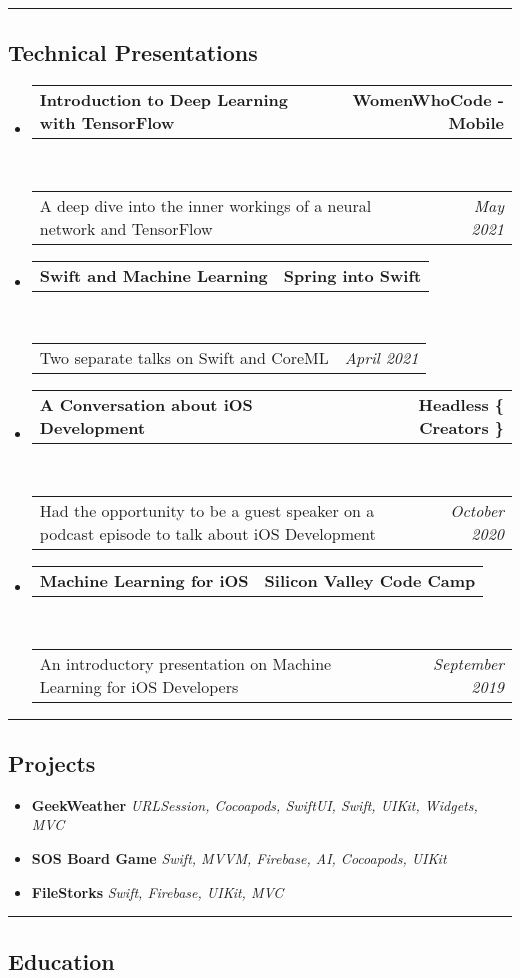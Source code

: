 \documentclass[9pt,letterpaper]{article}
\makeatletter
\newcommand{\headerrow}[2]
{\begin{tabular*}{\linewidth}{l@{\extracolsep{\fill}}r}
	#1 &
	#2 \\
\end{tabular*}}
\makeatother
\begin{document}
\hrule
\vspace{-0.4em}
\subsection*{Technical Presentations}

\begin{itemize}
	\parskip=0.1em
	\item
	\headerrow
		{\textbf{Introduction to Deep Learning with TensorFlow}}
		{\textbf{WomenWhoCode - Mobile}}
	\\
	\headerrow
		{A deep dive into the inner workings of a neural network and TensorFlow}
		{\emph{May 2021}}
	\item
	\headerrow
		{\textbf{Swift and Machine Learning}}
		{\textbf{Spring into Swift}}
	\\
	\headerrow
		{Two separate talks on Swift and CoreML}
		{\emph{April 2021}}
	\item
	\headerrow
		{\textbf{A Conversation about iOS Development}}
		{\textbf{Headless \{ Creators \}}}
	\\
	\headerrow
		{Had the opportunity to be a guest speaker on a podcast episode to talk about iOS Development}
		{\emph{October 2020}}
	\item
	\headerrow
		{\textbf{Machine Learning for iOS}}
		{\textbf{Silicon Valley Code Camp}}
	\\
	\headerrow
		{An introductory presentation on Machine Learning for iOS Developers}
		{\emph{September 2019}}
\end{itemize}

\hrule
\vspace{-0.4em}
\subsection*{Projects}

\begin{itemize}
	\parskip=0.1em
	\item {\textbf{GeekWeather}} \hfill
	{\emph{URLSession, Cocoapods, SwiftUI, Swift, UIKit, Widgets, MVC}}
	\item {\textbf{SOS Board Game}} \hfill
	{\emph{Swift, MVVM, Firebase, AI, Cocoapods, UIKit}}
	\item {\textbf{FileStorks}} \hfill
	{\emph{Swift, Firebase, UIKit, MVC}}
\end{itemize}


\hrule
\vspace{-0.4em}
\subsection*{Education}
\end{document}
